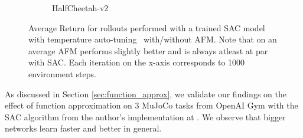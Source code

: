 \begin{figure}[t]
\begin{subfigure}[t]{0.33\textwidth}
    \caption{HalfCheetah-v2}
\end{subfigure}
\caption{Average Return for rollouts performed with a trained SAC model with temperature auto-tuning~\citep{haarnoja2018sacapps} with/without AFM. Note that on an average AFM performs slightly better and is always atleast at par with SAC. Each iteration on the x-axis corresponds to 1000 environment steps.}
\label{fig:sac_results_adv}
\end{figure}

\label{appendix:sac_size_plots}
As discussed in Section \ref{sec:function_approx}, we validate our findings on the effect of function approximation on 3 MuJoCo tasks from OpenAI Gym with the SAC algorithm from the author's implementation at \cite{haarnoja2018sacapps}. We observe that bigger networks learn faster and better in general.
